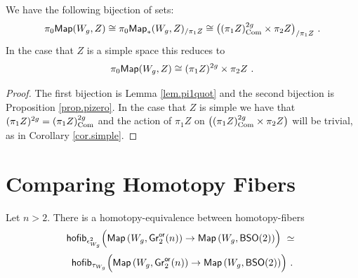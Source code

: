 \begin{cor} \label{maincor}
We have the following bijection of sets:
\[
\pi_{0}{\sf Map}(W_{g}, Z) \cong \pi_{0}{\sf Map}_{\ast}(W_{g}, Z)_{/\pi_{1}Z} \cong \bigl((\pi_{1}Z)^{2g}_{\rm Com} \times \pi_{2}Z \bigr)_{/\pi_{1}Z} ~.  
\]
In the case that $Z$ is a simple space this reduces to
\[
\pi_{0}{\sf Map}(W_{g}, Z) \cong (\pi_{1}Z)^{2g} \times \pi_{2}Z ~.  
\]
\end{cor}
\begin{proof}
The first bijection is Lemma \ref{lem.pi1quot} and the second bijection is Proposition \ref{prop.pizero}. In the case that $Z$ is simple we have that $(\pi_{1}Z)^{2g} = (\pi_{1}Z)^{2g}_{\rm Com}$ and the action of $\pi_{1}Z$ on $\bigl((\pi_{1}Z)^{2g}_{\rm Com} \times \pi_{2}Z \bigr)$ will be trivial, as in Corollary \ref{cor.simple}.
\end{proof}





\section{Comparing Homotopy Fibers}


\begin{lemma}
\label{a1z}
Let $n>2$.
There is a homotopy-equivalence between homotopy-fibers
\[
{\sf hofib}_{\epsilon^2_{W_g}} \Bigl(
\operatorname{{\sf Map}}\left( W_g , \operatorname{\sf Gr}^{\sf or}_2(n) \right) 
\to
\operatorname{{\sf Map}}\left( W_g , {\sf BSO}(2) \right) 
\Bigr)
~\simeq~
\]
\[
{\sf hofib}_{\tau_{W_g}} \Bigl(
\operatorname{{\sf Map}}\left( W_g , \operatorname{\sf Gr}^{\sf or}_2(n) \right) 
\to
\operatorname{{\sf Map}}\left( W_g , {\sf BSO}(2) \right) 
\Bigr)
~.
\]

\end{lemma}




